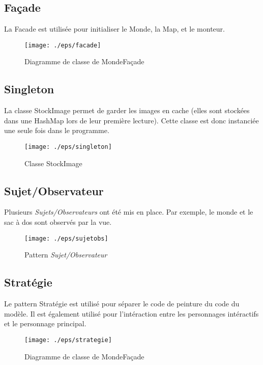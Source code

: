 \documentclass[a4paper]{article}
\begin{document}
    \subsection{Façade} 
	La Facade est utilisée pour initialiser le Monde, la Map, et le monteur.
    \begin{figure}[!h] 					%
        \centering						%
        \texttt{[image: ./eps/facade]}	%
        \caption{Diagramme de classe de MondeFaçade}	%
    \end{figure}
    \subsection{Singleton}
    La classe StockImage permet de garder les images en cache (elles sont stockées dans une HashMap lors de leur première lecture). Cette classe est donc instanciée une seule fois dans le programme.
    \begin{figure}[!h] 
    \centering
	\texttt{[image: ./eps/singleton]}	
     \caption{Classe StockImage}	
    \end{figure}
\subsection{Sujet/Observateur}
    Plusieurs \emph{Sujets/Observateurs} ont été mis en place. Par exemple, le monde et le sac à dos sont observés par la vue.
    \begin{figure}[!h] 
    \centering
	\texttt{[image: ./eps/sujetobs]}	
     \caption{Pattern \emph{Sujet/Observateur}}	
    \end{figure}
    \subsection{Stratégie}
        Le pattern Stratégie est utilisé pour séparer le code de peinture du code du modèle. Il est également utilisé pour l'intéraction entre les personnages intéractifs et le personnage principal.
        \begin{figure}[!h] 					%
            \centering						%
            \texttt{[image: ./eps/strategie]}	%
            \caption{Diagramme de classe de MondeFaçade}	%
        \end{figure}
\end{document}
